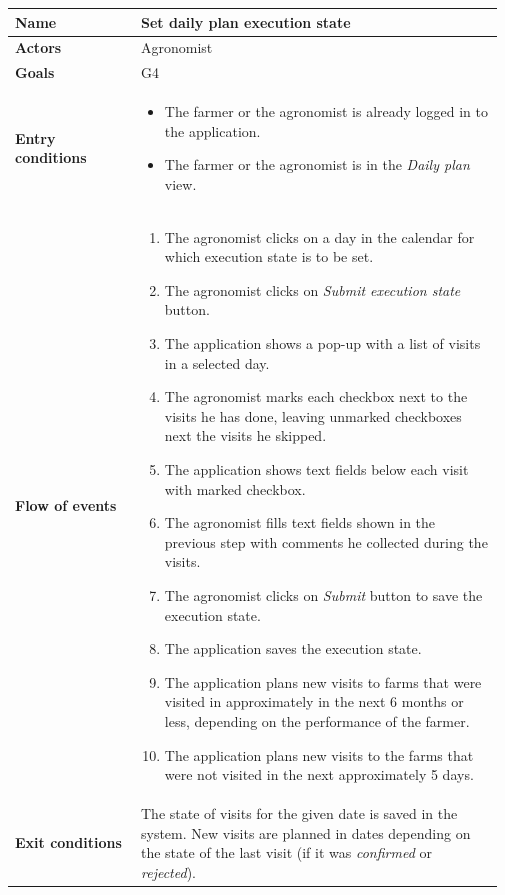 \begin{table}[H]
    \centering
	\begin{tabular}{@{}p{0.25\linewidth} p{0.72\linewidth}@{}}
		\toprule
		\textbf{Name}               & Set daily plan execution state \\
		\midrule
		\textbf{Actors}             & Agronomist\\
		\midrule
		\textbf{Goals}              & G4 \\
		\midrule
		
		\textbf{Entry conditions}   & \begin{itemize}[leftmargin=.4cm,noitemsep,topsep=0pt,before=\vspace{-3mm},after=\vspace{-4mm}]
		    \item The farmer or the agronomist is already logged in to the application.
		    \item The farmer or the agronomist is in the \textit{Daily plan} view.
		\end{itemize}\\
		\midrule
		
		\textbf{Flow of events}     & \begin{enumerate}[leftmargin=.4cm,noitemsep,topsep=0pt,before=\vspace{-3mm},after=\vspace{-4mm}]
		    \item The agronomist clicks on a day in the calendar for which execution state is to be set.
		    \item The agronomist clicks on \textit{Submit execution state} button.
		    \item The application shows a pop-up with a list of visits in a selected day.
		    \item The agronomist marks each checkbox next to the visits he has done, leaving unmarked checkboxes next the visits he skipped.
		    \item The application shows text fields below each visit with marked checkbox.
		    \item The agronomist fills text fields shown in the previous step with comments he collected during the visits.
		    \item The agronomist clicks on \textit{Submit} button to save the execution state.
		    \item The application saves the execution state.
		    \item The application plans new visits to farms that were visited in approximately in the next 6 months or less, depending on the performance of the farmer.
		    \item The application plans new visits to the farms that were not visited in the next approximately 5 days.
		\end{enumerate}\\
		\midrule
		\textbf{Exit conditions}    & The state of visits for the given date is saved in the system. New visits are planned in dates depending on the state of the last visit (if it was \textit{confirmed} or \textit{rejected}). \\
		\midrule
		

\end{tabular}
\end{table}
